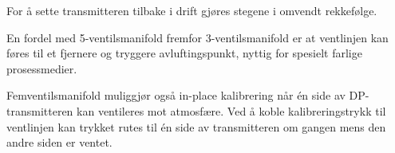 \vskip 10pt

For å sette transmitteren tilbake i drift gjøres stegene i omvendt rekkefølge.

En fordel med 5-ventilsmanifold fremfor 3-ventilsmanifold er at ventlinjen kan føres til et fjernere og tryggere avluftingspunkt, nyttig for spesielt farlige prosessmedier.

Femventilsmanifold muliggjør også in-place kalibrering når én side av DP-transmitteren kan ventileres mot atmosfære.  Ved å koble kalibreringstrykk til ventlinjen kan trykket rutes til én side av transmitteren om gangen mens den andre siden er ventet.











